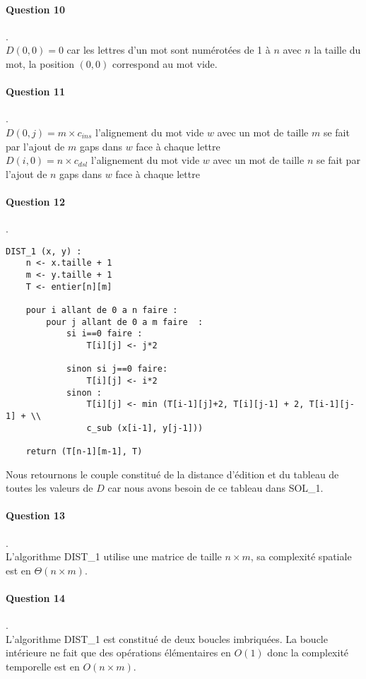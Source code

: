 \paragraph{Question 10}.\\
 $D(0, 0) = 0$ car les lettres d'un mot sont numérotées de 1 à $n$ avec $n$ la taille du mot, la position $(0,0)$ correspond au mot vide.
\paragraph{Question 11}.\\
$D(0, j) = m\times c_{ins} $ l'alignement du mot vide $w$ avec un mot de taille $m$ se fait par l'ajout de $m$ gaps dans $w$ face à chaque lettre\\
$D(i, 0) = n\times c_{dsl} $ l'alignement du mot vide $w$ avec un mot de taille $n$ se fait par l'ajout de $n$ gaps dans $w$ face à chaque lettre
\paragraph{Question 12}.\\
\begin{lstlisting}
DIST_1 (x, y) :
    n <- x.taille + 1
    m <- y.taille + 1
    T <- entier[n][m]

    pour i allant de 0 a n faire :
        pour j allant de 0 a m faire  :
            si i==0 faire :
                T[i][j] <- j*2

            sinon si j==0 faire:
                T[i][j] <- i*2
            sinon :
                T[i][j] <- min (T[i-1][j]+2, T[i][j-1] + 2, T[i-1][j-1] + \\
                c_sub (x[i-1], y[j-1]))

    return (T[n-1][m-1], T)
\end{lstlisting}
Nous retournons le couple constitué de la distance d'édition et du tableau de toutes les valeurs de $D$ car nous avons besoin de ce tableau dans SOL\_1.
\paragraph{Question 13}.\\
L'algorithme DIST\_1 utilise une matrice de taille $n \times m$, sa complexité spatiale est en $\Theta(n\times m)$.
\paragraph{Question 14}.\\
L'algorithme DIST\_1 est constitué de deux boucles imbriquées. La boucle intérieure ne fait que des opérations élémentaires en $O(1)$ donc la complexité temporelle est en $O(n\times m)$.
